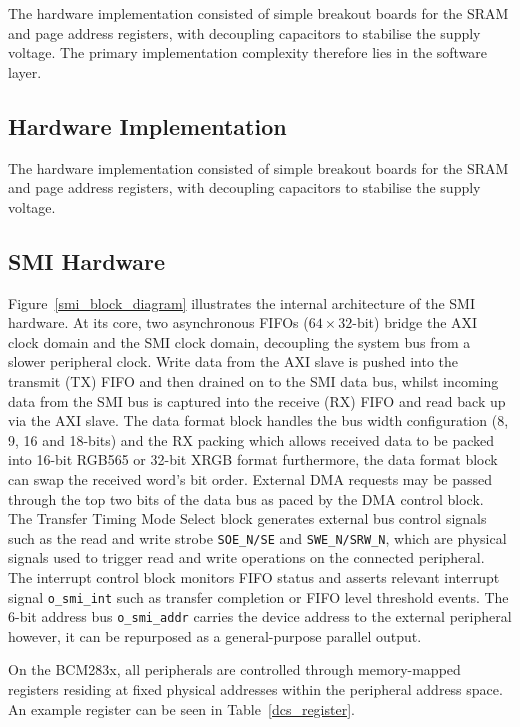 \documentclass[final]{cmpreport}
\begin{document}
The hardware implementation consisted of simple breakout boards for the SRAM and page address registers, with decoupling capacitors to stabilise the supply voltage. The primary implementation complexity therefore lies in the software layer.
\subsection{Hardware Implementation}
The hardware implementation consisted of simple breakout boards for the SRAM and page address registers, with decoupling capacitors to stabilise the supply voltage. 

\subsection{SMI Hardware}
Figure~\ref{smi_block_diagram} illustrates the internal architecture of the SMI hardware. At its core, two asynchronous FIFOs ($64 \times 32$-bit) bridge the AXI clock domain and the SMI clock domain, decoupling the system bus from a slower peripheral clock. Write data from the AXI slave is pushed into the transmit (TX) FIFO and then drained on to the SMI data bus, whilst incoming data from the SMI bus is captured into the receive (RX) FIFO and read back up via the AXI slave. The data format block handles the bus width configuration (8, 9, 16 and 18-bits) and the RX packing which allows received data to be packed into 16-bit RGB565 or 32-bit XRGB format furthermore, the data format block can swap the received word's bit order. External DMA requests may be passed through the top two bits of the data bus as paced by the DMA control block. The Transfer Timing Mode Select block generates external bus control signals such as the read and write strobe \texttt{SOE\_N/SE} and \texttt{SWE\_N/SRW\_N}, which are physical signals used to trigger read and write operations on the connected peripheral. The interrupt control block monitors FIFO status and asserts relevant interrupt signal \texttt{o\_smi\_int} such as transfer completion or FIFO level threshold events. The 6-bit address bus \texttt{o\_smi\_addr} carries the device address to the external peripheral however, it can be repurposed as a general-purpose parallel output.

On the BCM283x, all peripherals are controlled through memory-mapped registers residing at fixed physical addresses within the peripheral address space. An example register can be seen in Table~\ref{dcs_register}. 
\end{document}
